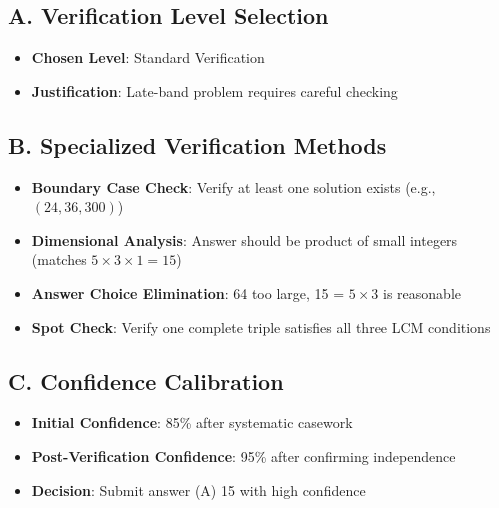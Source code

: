 \documentclass[12pt]{article}
\begin{document}
\begin{verificationbox}
\subsection*{A. Verification Level Selection}
\begin{itemize}[leftmargin=*]
    \item \textbf{Chosen Level}: Standard Verification
    \item \textbf{Justification}: Late-band problem requires careful checking
\end{itemize}

\subsection*{B. Specialized Verification Methods}
\begin{itemize}[leftmargin=*]
    \item \textbf{Boundary Case Check}: Verify at least one solution exists (e.g., $(24, 36, 300)$)
    \item \textbf{Dimensional Analysis}: Answer should be product of small integers (matches $5 \times 3 \times 1 = 15$)
    \item \textbf{Answer Choice Elimination}: 64 too large, 15 = $5 \times 3$ is reasonable
    \item \textbf{Spot Check}: Verify one complete triple satisfies all three LCM conditions
\end{itemize}

\subsection*{C. Confidence Calibration}
\begin{itemize}[leftmargin=*]
    \item \textbf{Initial Confidence}: 85\% after systematic casework
    \item \textbf{Post-Verification Confidence}: 95\% after confirming independence
    \item \textbf{Decision}: Submit answer (A) 15 with high confidence
\end{itemize}
\end{verificationbox}
\end{document}
